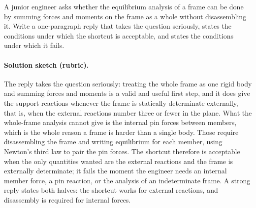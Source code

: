 \begin{exercise}
A junior engineer asks whether the equilibrium analysis of a frame
can be done by summing forces and moments on the frame as a whole
without disassembling it. Write a one-paragraph reply that takes
the question seriously, states the conditions under which the
shortcut is acceptable, and states the conditions under which it
fails.

\paragraph{Solution sketch (rubric).} The reply takes the question
seriously: treating the whole frame as one rigid body and summing forces
and moments is a valid and useful first step, and it does give the
support reactions whenever the frame is statically determinate
externally, that is, when the external reactions number three or fewer in
the plane. What the whole-frame analysis cannot give is the internal pin
forces between members, which is the whole reason a frame is harder than
a single body. Those require disassembling the frame and writing
equilibrium for each member, using Newton's third law to pair the pin
forces. The shortcut therefore is acceptable when the only quantities
wanted are the external reactions and the frame is externally
determinate; it fails the moment the engineer needs an internal member
force, a pin reaction, or the analysis of an indeterminate frame. A
strong reply states both halves: the shortcut works for external
reactions, and disassembly is required for internal forces.
\end{exercise}

